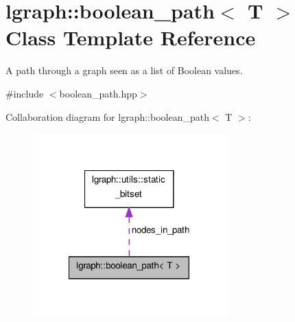 \hypertarget{classlgraph_1_1boolean__path}{\section{lgraph\-:\-:boolean\-\_\-path$<$ T $>$ Class Template Reference}
\label{classlgraph_1_1boolean__path}
}


A path through a graph seen as a list of Boolean values.  




{\ttfamily \#include $<$boolean\-\_\-path.\-hpp$>$}



Collaboration diagram for lgraph\-:\-:boolean\-\_\-path$<$ T $>$\-:
\nopagebreak
\begin{figure}[H]
\begin{center}
\leavevmode
\includegraphics[width=212pt]{classlgraph_1_1boolean__path__coll__graph}
\end{center}
\end{figure}
